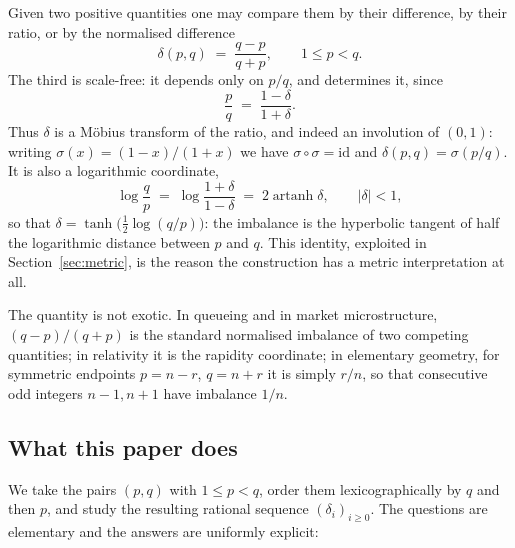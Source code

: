 \documentclass[11pt,a4paper]{article}
\theoremstyle{plain}
\theoremstyle{definition}
\theoremstyle{remark}
\DeclareMathOperator{\artanh}{artanh}
\begin{document}
Given two positive quantities one may compare them by their difference, by their
ratio, or by the normalised difference
\begin{equation}\label{eq:imb}
  \delta(p,q) \;=\; \frac{q-p}{q+p}, \qquad 1 \le p < q .
\end{equation}
The third is scale-free: it depends only on $p/q$, and determines it, since
\begin{equation}\label{eq:inverse}
  \frac{p}{q} \;=\; \frac{1-\delta}{1+\delta}.
\end{equation}
Thus $\delta$ is a M\"obius transform of the ratio, and indeed an involution of
$(0,1)$: writing $\sigma(x) = (1-x)/(1+x)$ we have $\sigma \circ \sigma = \mathrm{id}$
and $\delta(p,q) = \sigma(p/q)$. It is also a logarithmic coordinate,
\begin{equation}\label{eq:artanh}
  \log \frac{q}{p} \;=\; \log\frac{1+\delta}{1-\delta} \;=\; 2\artanh \delta,
  \qquad |\delta| < 1,
\end{equation}
so that $\delta = \tanh\bigl(\tfrac12 \log(q/p)\bigr)$: the imbalance is the
hyperbolic tangent of half the logarithmic distance between $p$ and $q$. This
identity, exploited in Section~\ref{sec:metric}, is the reason the construction
has a metric interpretation at all.

The quantity is not exotic. In queueing and in market microstructure,
$(q-p)/(q+p)$ is the standard normalised imbalance of two competing quantities;
in relativity it is the rapidity coordinate; in elementary geometry, for
symmetric endpoints $p = n-r$, $q = n+r$ it is simply $r/n$, so that consecutive
odd integers $n-1, n+1$ have imbalance $1/n$.

\subsection{What this paper does}

We take the pairs $(p,q)$ with $1 \le p < q$, order them lexicographically by
$q$ and then $p$, and study the resulting rational sequence
$(\delta_i)_{i \ge 0}$. The questions are elementary and the answers are
uniformly explicit:
\end{document}
